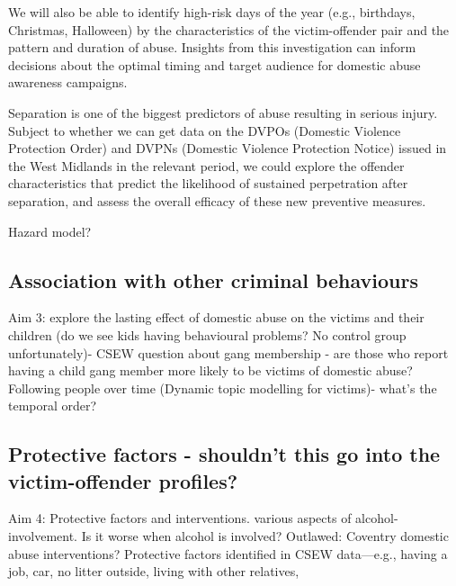 \documentclass[12pt, letterpaper]{article}
\begin{document}
We will also be able to identify high-risk days of the year (e.g., birthdays, Christmas, Halloween) by the characteristics of the victim-offender pair and the pattern and duration of abuse. Insights from this investigation can inform decisions about the optimal timing and target audience for domestic abuse awareness campaigns. 

Separation is one of the biggest predictors of abuse resulting in serious injury. Subject to whether we can get data on the DVPOs (Domestic Violence Protection Order) and DVPNs (Domestic Violence Protection Notice) issued in the West Midlands in the relevant period, we could explore the offender characteristics that predict the likelihood of sustained perpetration after separation, and assess the overall efficacy of these new preventive measures.


 Hazard model?


\subsection{Association with other criminal behaviours}


Aim 3: explore the lasting effect of domestic abuse on the victims and their children (do we see kids having behavioural problems? No control group unfortunately)- CSEW question about gang membership - are those who report having a child gang member more likely to be victims of domestic abuse? Following people over time (Dynamic topic modelling for victims)- what’s the temporal order? 

\subsection{Protective factors - shouldn't this go into the victim-offender profiles?}
Aim 4: Protective factors and interventions. various aspects of alcohol-involvement. Is it worse when alcohol is involved? {Outlawed: Coventry domestic abuse interventions?} Protective factors identified in CSEW data---e.g., having a job, car, no litter outside, living with other relatives,





\end{document}

